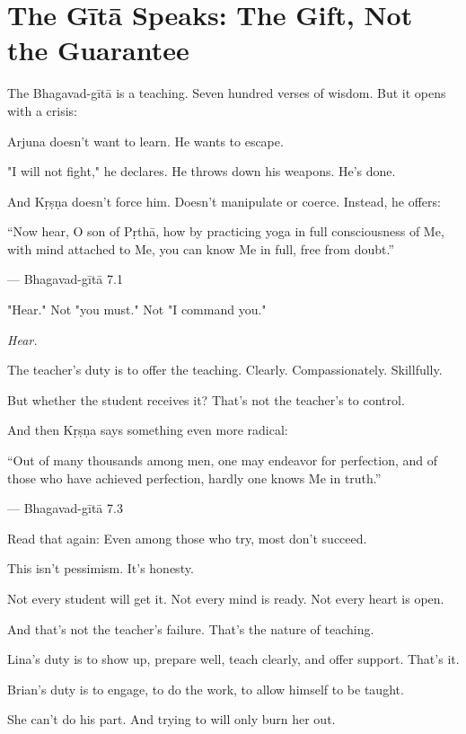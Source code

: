 \documentclass[11pt,twoside]{book}
\begin{document}
\section*{The Gītā Speaks: The Gift, Not the Guarantee}

The Bhagavad-gītā is a teaching. Seven hundred verses of wisdom. But it opens with a crisis:

Arjuna doesn't want to learn. He wants to escape.

"I will not fight," he declares. He throws down his weapons. He's done.

And Kṛṣṇa doesn't force him. Doesn't manipulate or coerce. Instead, he offers:

\begin{pullquote}
``Now hear, O son of Pṛthā, how by practicing yoga in full consciousness of Me, with mind attached to Me, you can know Me in full, free from doubt.''

--- Bhagavad-gītā 7.1
\end{pullquote}

"Hear." Not "you must." Not "I command you."

\emph{Hear.}

The teacher's duty is to offer the teaching. Clearly. Compassionately. Skillfully.

But whether the student receives it? That's not the teacher's to control.

And then Kṛṣṇa says something even more radical:

\begin{pullquote}
``Out of many thousands among men, one may endeavor for perfection, and of those who have achieved perfection, hardly one knows Me in truth.''

--- Bhagavad-gītā 7.3
\end{pullquote}

Read that again: Even among those who try, most don't succeed.

This isn't pessimism. It's honesty.

Not every student will get it. Not every mind is ready. Not every heart is open.

And that's not the teacher's failure. That's the nature of teaching.

Lina's duty is to show up, prepare well, teach clearly, and offer support. That's it.

Brian's duty is to engage, to do the work, to allow himself to be taught.

She can't do his part. And trying to will only burn her out.
\end{document}
